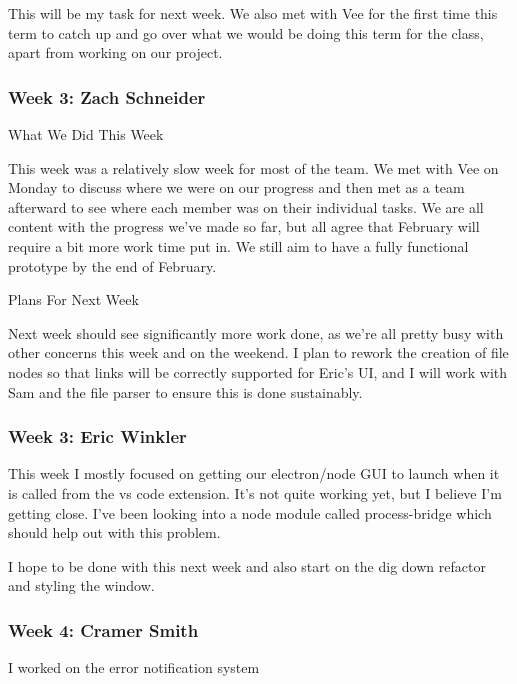 This will be my task for next week. We also met with Vee for the first time this term to catch up and go over what we would be doing this term for the class, apart from working on our project. \\ 

 \subsubsection{Week 3: Zach Schneider}

What We Did This Week

This week was a relatively slow week for most of the team. We met with Vee on Monday to discuss where we were on our progress and then met as a team afterward to see where each member was on their individual tasks. We are all content with the progress we've made so far, but all agree that February will require a bit more work time put in. We still aim to have a fully functional prototype by the end of February.



Plans For Next Week

Next week should see significantly more work done, as we're all pretty busy with other concerns this week and on the weekend. I plan to rework the creation of file nodes so that links will be correctly supported for Eric's UI, and I will work with Sam and the file parser to ensure this is done sustainably. \\ 

 \subsubsection{Week 3: Eric Winkler}

This week I mostly focused on getting our electron/node GUI to launch when it is called from the vs code extension. It's not quite working yet, but I believe I'm getting close. I've been looking into a node module called process-bridge which should help out with this problem.



I hope to be done with this next week and also start on the dig down refactor and styling the window. \\ 

 \subsubsection{Week 4: Cramer Smith}

I worked on the error notification system



